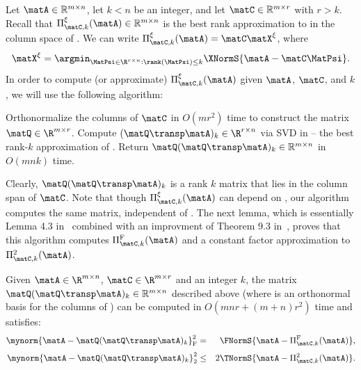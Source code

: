 Let $\matA \in \mathbb{R}^{m \times n}$, let $k < n$ be an integer, and let $\matC \in \mathbb{R}^{m \times r}$ with $r > k$. Recall that $\Pi_{\matC,k}^\xi(\matA) \in \mathbb{R}^{m \times n}$ is the best rank  approximation to \math{\matA} in the column space of \math{\matC}. We can write $\Pi_{\matC,k}^\xi(\matA) = \matC\matX^\xi$, where
$$
\matX^\xi = \argmin_{\MatPsi \in {\R}^{r \times n}:\rank(\MatPsi)\leq k}\XNormS{\matA-
\matC\MatPsi}.
$$
In order to compute (or approximate) $\Pi_{\matC,k}^{\xi}(\matA)$ given $\matA$,
$\matC$, and $k$, we will use the following algorithm:
\begin{center}
\begin{algorithmic}[1]
\STATE Orthonormalize the columns of $\matC$ in $O(m r^2)$ time to construct the matrix $\matQ \in \R^{m \times r}$.
\STATE Compute
 $(\matQ\transp \matA)_k \in \R^{r \times n}$ via SVD
in  -- the best rank-$k$ approximation of
\math{\matQ\transp\matA}.
\STATE Return $\matQ(\matQ\transp \matA)_k \in \mathbb{R}^{m \times n}$ in $O(mnk)$ time.
\end{algorithmic}
\end{center}
\medskip
Clearly, $\matQ(\matQ\transp \matA)_k$ is a rank $k$ matrix that lies in the column span of $\matC$. Note that though  $\Pi_{\matC,k}^{\xi}(\matA)$ can depend on \math{\xi}, our algorithm computes the same matrix, independent of \math{\xi}. The next lemma, which is essentially Lemma 4.3 in~\cite{CW09} combined with an improvment of Theorem 9.3 in~\cite{HMT},
proves that this algorithm computes $\Pi_{\matC,k}^{\mathrm{F}}(\matA)$ and a constant factor approximation to $\Pi_{\matC,k}^{2}(\matA)$.
\begin{lemma}\label{lem:bestF}
Given $\matA \in {\R}^{m \times n}$, $\matC\in\R^{m\times r}$ and an integer $k$,  the matrix $\matQ(\matQ\transp \matA)_k \in \mathbb{R}^{m \times n}$ described above (where \math{\matQ} is an orthonormal basis for the columns of \math{\matC}) can be computed in $O\left(mnr + (m+n)r^2\right)$ time and satisfies:
\begin{eqnarray*}
\mynorm{\matA-\matQ(\matQ\transp \matA)_k}_{\mathrm{F}}^2 &=& \FNormS{\matA-\Pi_{\matC,k}^{\mathrm{F}}(\matA)},\\[3pt]
\mynorm{\matA-\matQ(\matQ\transp \matA)_k}_2^2 &\leq& 2\TNormS{\matA-\Pi_{\matC,k}^{2}(\matA)}.
\end{eqnarray*}
\end{lemma}

